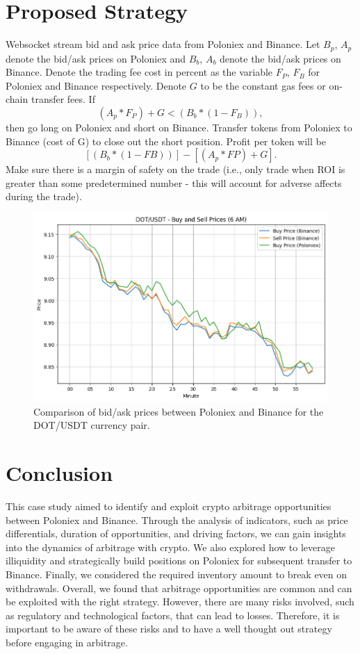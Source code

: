 \documentclass{article}
\begin{document}
\section{Proposed Strategy}
Websocket stream bid and ask price data from Poloniex and Binance. Let $B_p$, $A_p$ denote the bid/ask prices on Poloniex and $B_b$, $A_b$ denote the bid/ask prices on Binance. Denote the trading fee cost in percent as the variable $F_P$, $F_B$ for Poloniex and Binance respectively. Denote $G$ to be the constant gas fees or on-chain transfer fees. If \[(A_p * F_P) + G < (B_b * (1 - F_B)),\] then go long on Poloniex and short on Binance. Transfer tokens from Poloniex to Binance (cost of G) to close out the short position. Profit per token will be \[[(B_b * (1 - FB))] - [(A_p * FP) + G].\] Make sure there is a margin of safety on the trade (i.e., only trade when ROI is greater than some predetermined number - this will account for adverse affects during the trade).

\begin{figure}
  \centering
  \includegraphics[width=\linewidth]{arbitrage.png}
  \caption{Comparison of bid/ask prices between Poloniex and Binance for the DOT/USDT currency pair.}
  \label{fig:arbitrage}
\end{figure}

\newpage
\section{Conclusion}
This case study aimed to identify and exploit crypto arbitrage opportunities between Poloniex and Binance. Through the analysis of indicators, such as price differentials, duration of opportunities, and driving factors, we can gain insights into the dynamics of arbitrage with crypto. We also explored how to leverage illiquidity and strategically build positions on Poloniex for subsequent transfer to Binance. Finally, we considered the required inventory amount to break even on withdrawals. Overall, we found that arbitrage opportunities are common and can be exploited with the right strategy. However, there are many risks involved, such as regulatory and technological factors, that can lead to losses. Therefore, it is important to be aware of these risks and to have a well thought out strategy before engaging in arbitrage.
\end{document}
